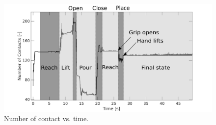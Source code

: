 \begin{figure}[!h]
	\centering
    \includegraphics[width=0.95\columnwidth]{figures/dual_arm/dual_arm_contact.png}
    \caption{\label{fig:dual_arm_contacts} Number of contact vs. time.}
\end{figure}

